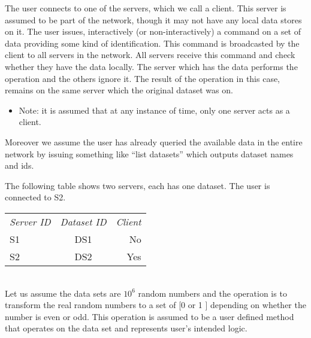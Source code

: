 
The user connects to one of the servers, which we call a client. This server is assumed to be part 
of the network, though it may not have any local data stores on it. The user issues, interactively
(or non-interactively) a command on a set of data providing some kind of identification. This command
is broadcasted by the client to all servers in the network. All servers receive this command and check
whether they have the data locally. The server which has the data performs the operation and the others
ignore it. The result of the operation in this case, remains on the same server which the original 
dataset was on. 

\begin{itemize}
\item Note: it is assumed that at any instance of time, only one server acts as a client.
\end{itemize}

Moreover we assume the user has already queried the available data in the entire network by 
issuing something like “list datasets” which outputs dataset names and ids.

The following table shows two servers, each has one dataset. The user is connected to S2.\\

\begin{tabular}{ l c r }
\em{Server ID} & \em{ Dataset ID} & \em{ Client} \\
S1 & DS1 & No \\
S2 & DS2 & Yes \\
\end{tabular}\\

Let us assume the data sets are \(10^6\) random numbers and
the operation is to transform the real random numbers to a set of [0 or 1 ] depending on whether the number is even or odd. 
This operation is assumed to be a user defined method that operates on the data set and 
represents user's intended logic.


